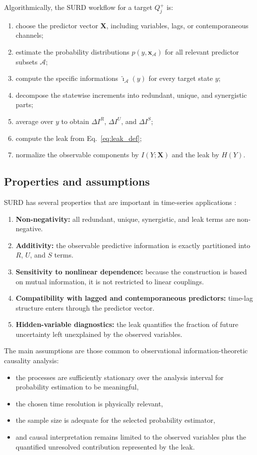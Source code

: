 \documentclass[12pt, a4paper]{article}
\begin{document}
Algorithmically, the SURD workflow for a target \(Q_j^+\) is:
\begin{enumerate}
    \item choose the predictor vector \(\mathbf{X}\), including variables, lags, or contemporaneous channels;
    \item estimate the probability distributions \(p(y,\mathbf{x}_{\mathcal{A}})\) for all relevant predictor subsets \(\mathcal{A}\);
    \item compute the specific informations \(\tilde{\imath}_{\mathcal{A}}(y)\) for every target state \(y\);
    \item decompose the statewise increments into redundant, unique, and synergistic parts;
    \item average over \(y\) to obtain \(\Delta I^R\), \(\Delta I^U\), and \(\Delta I^S\);
    \item compute the leak from Eq.~\eqref{eq:leak_def};
    \item normalize the observable components by \(I(Y;\mathbf{X})\) and the leak by \(H(Y)\).
\end{enumerate}

\subsection{Properties and assumptions}

SURD has several properties that are important in time-series applications \cite{MartinezSanchez2024SURD}:
\begin{enumerate}
    \item \textbf{Non-negativity:} all redundant, unique, synergistic, and leak terms are non-negative.
    \item \textbf{Additivity:} the observable predictive information is exactly partitioned into \(R\), \(U\), and \(S\) terms.
    \item \textbf{Sensitivity to nonlinear dependence:} because the construction is based on mutual information, it is not restricted to linear couplings.
    \item \textbf{Compatibility with lagged and contemporaneous predictors:} time-lag structure enters through the predictor vector.
    \item \textbf{Hidden-variable diagnostics:} the leak quantifies the fraction of future uncertainty left unexplained by the observed variables.
\end{enumerate}

The main assumptions are those common to observational information-theoretic causality analysis:
\begin{itemize}
    \item the processes are sufficiently stationary over the analysis interval for probability estimation to be meaningful,
    \item the chosen time resolution is physically relevant,
    \item the sample size is adequate for the selected probability estimator,
    \item and causal interpretation remains limited to the observed variables plus the quantified unresolved contribution represented by the leak.
\end{itemize}
\end{document}
